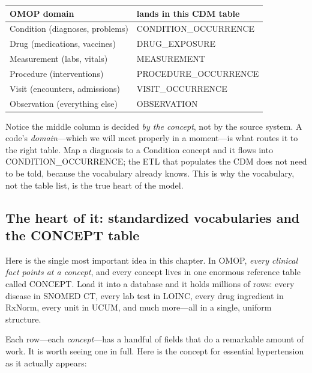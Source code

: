 \documentclass[12pt,openany]{book}
\newcommand{\code}[1]{{\ttfamily\small #1}}
\begin{document}
\begin{center}
\small\sffamily
\begin{tabular}{@{}ll@{}}
\toprule
\textbf{OMOP domain} & \textbf{lands in this CDM table} \\
\midrule
Condition (diagnoses, problems) & \code{CONDITION\_OCCURRENCE} \\
Drug (medications, vaccines) & \code{DRUG\_EXPOSURE} \\
Measurement (labs, vitals) & \code{MEASUREMENT} \\
Procedure (interventions) & \code{PROCEDURE\_OCCURRENCE} \\
Visit (encounters, admissions) & \code{VISIT\_OCCURRENCE} \\
Observation (everything else) & \code{OBSERVATION} \\
\bottomrule
\end{tabular}
\end{center}

Notice the middle column is decided \emph{by the concept}, not by the source system. A code's
\emph{domain}---which we will meet properly in a moment---is what routes it to the right table. Map a
diagnosis to a Condition concept and it flows into \code{CONDITION\_OCCURRENCE}; the ETL that
populates the CDM does not need to be told, because the vocabulary already knows. This is why the
vocabulary, not the table list, is the true heart of the model.

\subsection{The heart of it: standardized vocabularies and the CONCEPT table}

Here is the single most important idea in this chapter. In OMOP, \emph{every clinical fact points at
a concept}, and every concept lives in one enormous reference table called \code{CONCEPT}. Load it
into a database and it holds millions of rows: every disease in SNOMED CT, every lab test in LOINC,
every drug ingredient in RxNorm, every unit in UCUM, and much more---all in a single, uniform
structure.

Each row---each \emph{concept}---has a handful of fields that do a remarkable amount of work. It is
worth seeing one in full. Here is the concept for essential hypertension as it actually appears:
\end{document}
